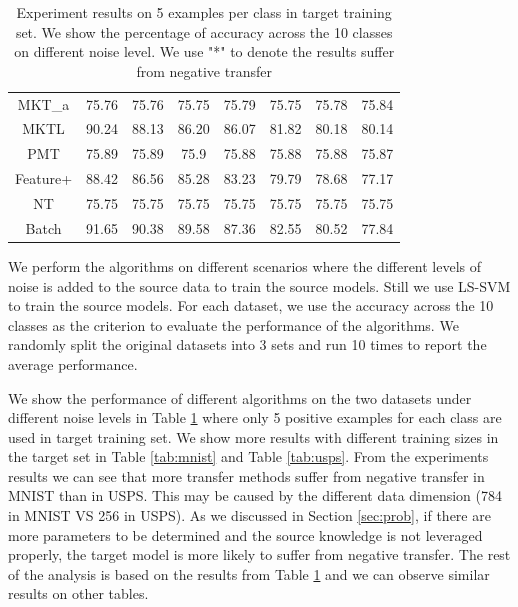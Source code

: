 \begin{table}[htbp]
{{\begin{tabular}{|c|c|c|c|c|c|c|c|}
				MKT\_{a} & 75.76 & 75.76 & 75.75 & 75.79 & 75.75 & 75.78 & 75.84\\ 
				MKTL & 90.24 & 88.13 & 86.20 & 86.07 & 81.82 & 80.18 & 80.14\\ 
				PMT & 75.89 & 75.89 & 75.9 & 75.88 & 75.88 & 75.88 & 75.87\\ 
				Feature+ & 88.42 & 86.56 & 85.28 & 83.23 & 79.79 & 78.68 & 77.17\\ 
				NT & 75.75 & 75.75 & 75.75 & 75.75 & 75.75 & 75.75 & 75.75\\ 
				Batch & 91.65 & 90.38 & 89.58 & 87.36 & 82.55 & 80.52 & 77.84\\ 
				\hline\end{tabular}}}%
	\caption{Experiment results on 5 examples per class in target training set. We show the percentage of accuracy across the 10 classes on different noise level. We use "*" to denote the results suffer from negative transfer}\label{tab:rs}
\end{table}%

We perform the algorithms on different scenarios where the different levels of noise is added to the source data to train the source models. Still we use LS-SVM to train the source models. For each dataset, we use the accuracy across the 10 classes as the criterion to evaluate the performance of the algorithms. We randomly split the original datasets into 3 sets and run 10 times to report the average performance. 

We show the performance of different algorithms on the two datasets under different noise levels in Table \ref{tab:rs} where only 5 positive examples for each class are used in target training set. We show more results with different training sizes in the target set in Table \ref{tab:mnist} and Table \ref{tab:usps}. From the experiments results we can see that more transfer methods suffer from negative transfer in MNIST than in USPS. This may be caused by the different data dimension (784 in MNIST VS 256 in USPS). As we discussed in Section \ref{sec:prob}, if there are more parameters to be determined and the source knowledge is not leveraged properly, the target model is more likely to suffer from negative transfer.
The rest of the analysis is based on the results from Table \ref{tab:rs} and we can observe similar results on other tables.

